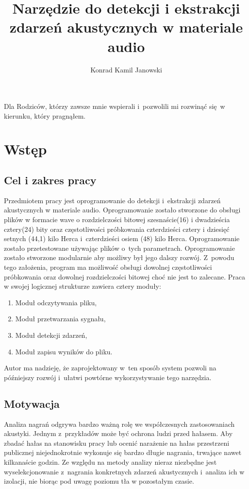 \documentclass[eng,printmode]{mgr}
\title{Narzędzie do detekcji i ekstrakcji zdarzeń akustycznych w materiale audio}
\author{Konrad Kamil Janowski}
\begin{document}
 
\maketitle %
\dedication{6cm}{Dla Rodziców, którzy zawsze mnie wspierali i~pozwolili mi rozwinąć się~w kierunku, który pragnąłem.}

\tableofcontents %

\chapter{Wstęp}
\section{Cel i zakres pracy}
Przedmiotem pracy jest oprogramowanie do detekcji i~ekstrakcji zdarzeń akustycznych w materiale audio. Oprogramowanie zostało stworzone do obsługi plików w formacie wave o rozdzielczości bitowej szesnaście(16) i dwadzieścia cztery(24) bity oraz częstotliwości próbkowania czterdzieści cztery i dziesięć setnych (44,1) kilo Herca i~czterdzieści osiem (48) kilo Herca. Oprogramowanie zostało przetestowane używając plików o~tych parametrach. Oprogramowanie zostało stworzone modularnie aby możliwy był jego dalszy rozwój. Z~powodu tego założenia, program ma możliwość obsługi dowolnej częstotliwości próbkowania oraz dowolnej rozdzielczości bitowej choć nie jest to zalecane. Praca w swojej logicznej strukturze zawiera cztery moduły:
\begin{enumerate}
\item Moduł odczytywania pliku,
\item Moduł przetwarzania sygnału,
\item Moduł detekcji zdarzeń,
\item Moduł zapisu wyników do pliku.
\end{enumerate}
Autor ma nadzieję, że zaprojektowany w~ten sposób system pozwoli na późniejszy rozwój i~ułatwi powtórne wykorzystywanie tego narzędzia.
\section{Motywacja}
Analiza nagrań odgrywa bardzo ważną rolę we współczesnych zastosowaniach akustyki. Jednym z~przykładów może być ochrona ludzi przed hałasem. Aby zbadać hałas na stanowisku pracy lub ocenić narażenie na hałas przestrzeni publicznej niejednokrotnie wykonuje się bardzo długie nagrania, trwające nawet kilkanaście godzin. Ze względu na metody analizy nieraz niezbędne jest wyselekcjonowanie z~nagrania konkretnych zdarzeń akustycznych i~analiza ich w izolacji, nie biorąc pod uwagę poziomu tła w pozostałym czasie. 
\end{document}
